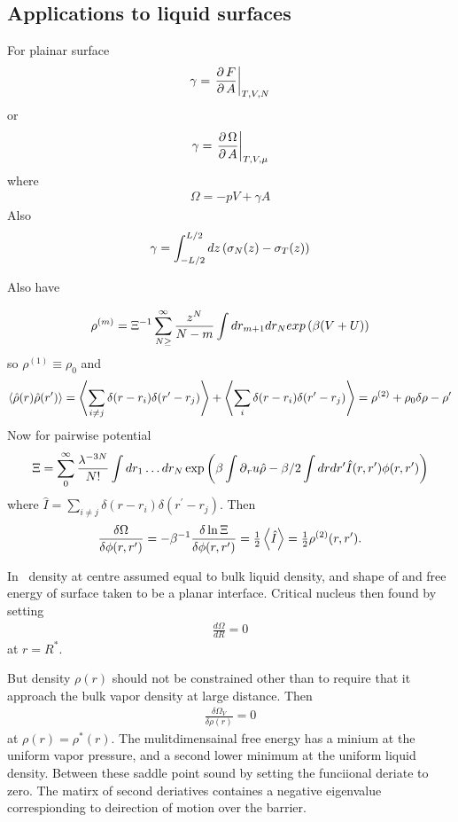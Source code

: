 \subsection{Applications to liquid surfaces}


For plainar surface
\begin{align}
\gamma = \left.{\frac{\operatorname{\partial} F}{\operatorname{\partial} A}}\right|_{T, V, N}
\end{align}
or 
\begin{align}
\gamma = \left.{\frac{\operatorname{\partial} \Omega}{\operatorname{\partial} A}}\right|_{T, V, \mu}
\end{align}
where
\begin{align}
  \Omega = -pV + \gamma A
\end{align}
Also
\begin{align}
  \gamma = \int_{-L/2}^{L/2} dz \left( \sigma_N(z) - \sigma_T(z) \right)
\end{align}


Also have

\begin{align}
  \rho^{(m)} = \Xi^{-1} \sum_{N\ge }^\infty \frac{z^N}{N-m} \int d r_{m+1} dr_N exp\left( \beta(V + U) \right)
\end{align}
so $\rho^{(1)} \equiv \rho_0$
and 
\begin{align}
  \left< \hat \rho(r) \hat \rho(r^\prime) \right> =\left< \sum_{i\ne j} \delta(r-r_i) \delta(r^\prime - r_j) \right> + \left< \sum_{i} \delta(r-r_i) \delta(r^\prime - r_j) \right>
= \rho^{(2)} + \rho_0\delta{\rho- \rho^\prime}
\end{align}
Now for pairwise potential
\begin{align}
 \Xi = \sum_0 ^\infty \frac{\lambda^{-3N}}{N!} \int dr_1 \ldots d r_N \exp\left( \beta \int {\operatorname{\partial}_r} u \hat \rho - \beta/2 \int dr dr^\prime \hat I (r,r^\prime)\phi(r,r^\prime) \right)
\end{align}
where $\hat I = \sum_{i\ne j} \delta(r - r_i)\delta(r^\prime - r_j)$.
Then
\begin{align}
  \frac{\delta \Omega}{\delta \phi(r,r^\prime)} = -\beta^{-1} \frac{\delta \ln \Xi}{\delta \phi(r, r^\prime)} = \tfrac{1}{2} \left< \hat I \right> = \tfrac{1}{2} \rho^{(2)}(r,r^\prime).
\end{align}


In \cnt\ density at centre assumed equal to bulk liquid density, 
and shape of and free energy of surface taken to be a planar interface.
Critical nucleus then found by setting 
\begin{align}
\frac{d \Omega}{d R} =0
\end{align}
at $r = R^\ast$.

But density $\rho(r)$ should not be constrained other than to require that it approach the bulk vapor density at large distance.
Then 
\begin{align}
\frac{\delta \Omega_V}{\delta \rho(r)} = 0
\end{align}
at $\rho(r) = \rho^\ast(r)$.
The mulitdimensainal free energy has a minium at the uniform vapor pressure,
and a second lower minimum at the  uniform liquid density. Between these saddle point sound by setting the funciional deriate to zero.
The matirx of second deriatives containes a negative eigenvalue correspionding to deirection of motion over the barrier.

